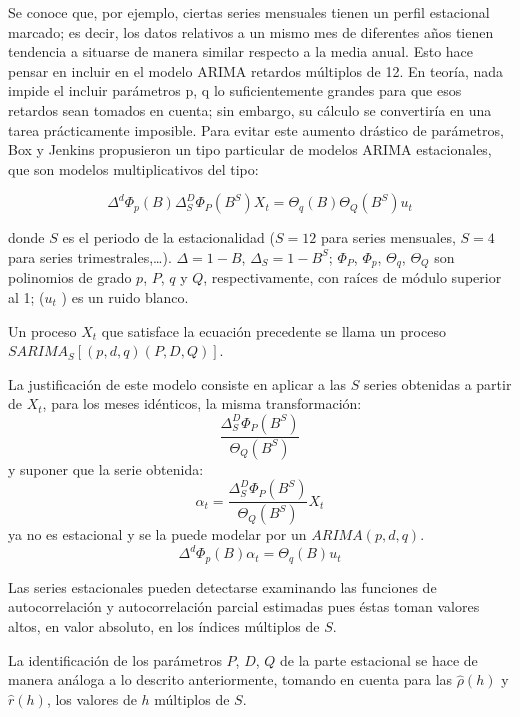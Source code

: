 Se conoce que, por ejemplo, ciertas series mensuales tienen un perfil estacional marcado; es decir, los datos relativos a un mismo mes de diferentes a\~{n}os tienen tendencia a situarse de manera similar respecto a la media anual. Esto hace pensar en incluir en el modelo ARIMA retardos m\'{u}ltiplos de 12. En teor\'{i}a, nada impide el incluir par\'{a}metros p, q lo suficientemente grandes para que esos retardos sean tomados en cuenta; sin embargo, su c\'{a}lculo se convertir\'{i}a en una tarea pr\'{a}cticamente imposible. Para evitar este aumento dr\'{a}stico de par\'{a}metros, Box y Jenkins propusieron un tipo particular de modelos ARIMA estacionales, que son modelos multiplicativos del tipo:

\[
\Delta^{d}\Phi_{p} (B)\Delta_{S}^{D} \Phi_{P} (B^{S})X_{t} =\Theta_{q} 
(B)\Theta_{Q} (B^{S})u_{t} 
\]

donde $S$ es el periodo de la estacionalidad ($S=12$ para series mensuales, $S=4$ para series trimestrales,\dots). $\Delta =1-B$, $\Delta_{S} =1-B^{S}$; $\Phi_{P}$, $\Phi_{p}$, $\Theta_{q}$, $\Theta_{Q}$ son polinomios de grado $p$, $P$, $q$ y $Q$, respectivamente, con ra\'{i}ces de m\'{o}dulo superior al 1; ($u_{t}$ ) es un ruido blanco.\newline

Un proceso $X_{t}$ que satisface la ecuaci\'{o}n precedente se llama un proceso $SARIMA_S[(p, d, q) (P, D, Q)]$.\newline

La justificaci\'{o}n de este modelo consiste en aplicar a las $S$ series obtenidas a partir de $X_{t}$, para los meses id\'{e}nticos, la misma transformaci\'{o}n:
\[
\frac{\Delta_{S}^{D} \Phi_{P} (B^{S})}{\Theta_{Q} (B^{S})}
\]
y suponer que la serie obtenida:
\[
\alpha_{t} =\frac{\Delta_{S}^{D} \Phi_{P} (B^{S})}{\Theta_{Q} 
(B^{S})}X_{t} 
\]
ya no es estacional y se la puede modelar por un $ARIMA (p, d, q)$.
\[
\Delta^{d}\Phi_{p} (B)\alpha_{t} =\Theta_{q} (B)u_{t} 
\]

Las series estacionales pueden detectarse examinando las funciones de autocorrelaci\'{o}n y autocorrelaci\'{o}n parcial estimadas pues \'{e}stas toman valores altos, en valor absoluto, en los \'{i}ndices m\'{u}ltiplos de $S$.\newline

La identificaci\'{o}n de los par\'{a}metros $P$, $D$, $Q$ de la parte estacional se hace de manera an\'{a}loga a lo descrito anteriormente, tomando en cuenta para las $\widehat{\rho}(h)$ y $\widehat{r}(h)$, los valores de $h$ m\'{u}ltiplos de $S$.\newline

